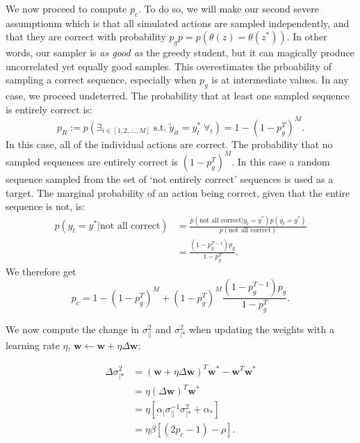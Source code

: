\documentclass{article}
\renewcommand\b\bm
\begin{document}
We now proceed to compute $p_c$.
To do so, we will make our second severe assumptionm which is that all simulated actions are sampled independently, and that they are correct with probability $p_gp = p(\theta(z) = \theta(z^*))$.
In other words, our sampler is \emph{as good as} the greedy student, but it can magically produce uncorrelated yet equally good samples.
This overestimates the prboability of sampling a correct sequence, especially when $p_g$ is at intermediate values.
In any case, we proceed undeterred.
The probability that at least one sampled sequence is entirely correct is:
\begin{equation}
    p_R := p( \exists_{i \in [1, 2, \ldots, M]} \; \text{s.t.} \; \tilde{y}_{it} = {y_t^*} \; \forall_t) = 1 - (1 - p_g^T)^M.
\end{equation}
In this case, all of the individual actions are correct.
The probability that no sampled sequences are entirely correct is $(1 - p_g^T)^M$.
In this case a random sequence sampled from the set of `not entirely correct' sequences is used as a target.
The marginal probability of an action being correct, given that the entire sequence is not, is:
\begin{align}
    p(y_t = y^* | \text{not all correct}) &= \frac{p(\text{not all correct}| y_t = y^*) p(y_t = y^*)}{p(\text{not all correct})}\\
    &= \frac{(1 - p_g^{T-1}) p_g}{1 - p_g^T}.
\end{align}
We therefore get
\begin{equation}
    \label{eq:pc}
    p_c = 1 - (1 - p_g^T)^M + (1 - p_g^T)^M \frac{(1 - p_g^{T-1}) p_g}{1 - p_g^T}.
\end{equation}

We now compute the change in $\sigma_{||}^2$ and $\sigma_{|*}^2$ when updating the weights with a learning rate $\eta$, $\b{w} \leftarrow \b{w} + \eta \Delta \b{w}$:

\begin{align}
    \label{eq:corr_change}
    \Delta \sigma_{|*}^2 &= (\b{w} + \eta \Delta \b{w})^T \b{w}^* - \b{w}^T \b{w}^* \\
    &= \eta (\Delta \b{w})^T \b{w}^* \\
    &= \eta \left [ \alpha_| \sigma_{||}^{-1} \sigma_{|*}^2 + \alpha_* \right ]\\
    &= \eta \beta \left [  (2 p_c - 1) - \rho \right ].
\end{align}
\end{document}
